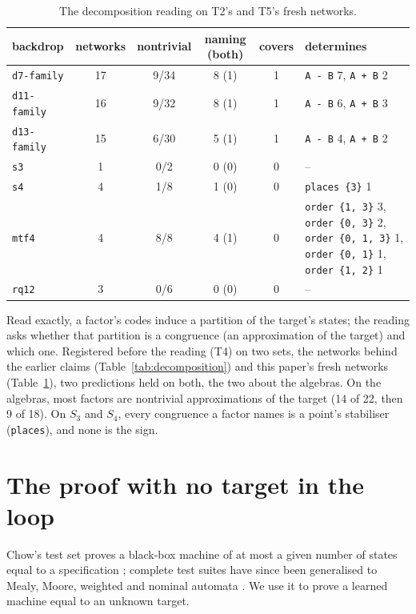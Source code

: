 \documentclass[11pt]{article}
\newcommand{\pn}[2]{#2}
\begin{document}
\begin{table}[t]
\centering
\caption{The decomposition reading on T2's and T5's fresh networks.}
\label{tab:decomposition-fresh}
\begin{tabular}{lcccc>{\raggedright\arraybackslash}p{2.6cm}}
\toprule
backdrop & networks & nontrivial & naming (both) & covers & determines \\
\midrule
\texttt{d7-family} & 17 & 9/34 & 8 (1) & 1 & \texttt{A - B} 7, \texttt{A + B} 2 \\
\texttt{d11-family} & 16 & 9/32 & 8 (1) & 1 & \texttt{A - B} 6, \texttt{A + B} 3 \\
\texttt{d13-family} & 15 & 6/30 & 5 (1) & 1 & \texttt{A - B} 4, \texttt{A + B} 2 \\
\texttt{s3} & 1 & 0/2 & 0 (0) & 0 & -- \\
\texttt{s4} & 4 & 1/8 & 1 (0) & 0 & \texttt{places \{3\}} 1 \\
\texttt{mtf4} & 4 & 8/8 & 4 (1) & 0 & \texttt{order \{1, 3\}} 3, \texttt{order \{0, 3\}} 2, \texttt{order \{0, 1, 3\}} 1, \texttt{order \{0, 1\}} 1, \texttt{order \{1, 2\}} 1 \\
\texttt{rq12} & 3 & 0/6 & 0 (0) & 0 & -- \\
\bottomrule
\end{tabular}
\end{table}

Read exactly, a factor's codes induce a partition of the target's states; the reading asks whether
that partition is a congruence (an approximation of the target) and which one. Registered before
the reading (T4) on two sets, the networks behind the earlier claims (Table~\ref{tab:decomposition})
and this paper's fresh networks (Table~\ref{tab:decomposition-fresh}), two predictions held on both, the two
about the algebras.
On the algebras, most factors are nontrivial approximations of the target
(\pn{k8.algebras-first}{14 of 22}, then \pn{k8.algebras-fresh}{9 of 18}). On $S_3$ and $S_4$,
\pn{k8.groups-places}{every} congruence a factor names is a point's stabiliser (\texttt{places}), and
\pn{k8.groups-sign}{none} is the sign.

\section{The proof with no target in the loop}
\label{app:proof}

Chow's test set proves a black-box machine of at most a given number of states equal to a
specification \citep{chow-1978-testing-software-design-finite-state-machines}; complete test suites
have since been generalised to Mealy, Moore, weighted and nominal automata
\citep{kocsis-2024-complete-test-suites-monoidal-closed}. We use it to prove a learned machine equal
to an unknown target.
\end{document}
